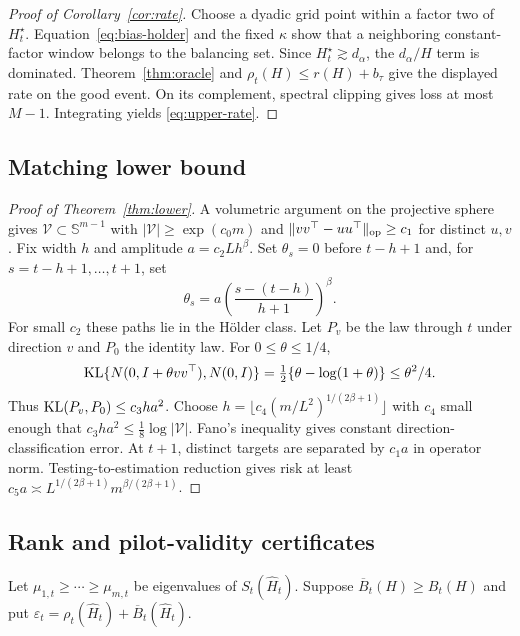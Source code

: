 \begin{proof}[Proof of Corollary~\ref{cor:rate}]
Choose a dyadic grid point within a factor two of $H_t^\star$.  Equation~\eqref{eq:bias-holder} and the fixed $\kappa$ show that a neighboring constant-factor window belongs to the balancing set.  Since $H_t^\star\gtrsim d_\alpha$, the $d_\alpha/H$ term is dominated.  Theorem~\ref{thm:oracle} and $\rho_t(H)\le r(H)+b_\tau$ give the displayed rate on the good event.  On its complement, spectral clipping gives loss at most $M-1$.  Integrating yields \eqref{eq:upper-rate}.  \end{proof}

\subsection{Matching lower bound}

\begin{proof}[Proof of Theorem~\ref{thm:lower}]
A volumetric argument on the projective sphere gives $\mathcal V\subset\mathbb S^{m-1}$ with $|\mathcal V|\ge\exp(c_0m)$ and $\|vv^\top-uu^\top\|_{\mathrm{op}}\ge c_1$ for distinct $u,v$.  Fix width $h$ and amplitude $a=c_2Lh^\beta$.  Set $\theta_s=0$ before $t-h+1$ and, for $s=t-h+1,\ldots,t+1$, set
\begin{equation}
 \theta_s=a\left(\frac{s-(t-h)}{h+1}\right)^\beta.
\end{equation}
For small $c_2$ these paths lie in the H\"older class.  Let $P_v$ be the law through $t$ under direction $v$ and $P_0$ the identity law.  For $0\le\theta\le1/4$,
\begin{equation}
 \operatorname{KL}\{N(0,I+\theta vv^\top),N(0,I)\}
 =\tfrac12\{\theta-\log(1+\theta)\}\le\theta^2/4.
\end{equation}
Thus $\operatorname{KL}(P_v,P_0)\le c_3ha^2$.  Choose
$h=\lfloor c_4(m/L^2)^{1/(2\beta+1)}\rfloor$ with $c_4$ small enough that $c_3ha^2\le\frac18\log|\mathcal V|$.  Fano's inequality gives constant direction-classification error.  At $t+1$, distinct targets are separated by $c_1a$ in operator norm.  Testing-to-estimation reduction gives risk at least $c_5a\asymp L^{1/(2\beta+1)}m^{\beta/(2\beta+1)}$.  \end{proof}

\subsection{Rank and pilot-validity certificates}

Let $\mu_{1,t}\ge\cdots\ge\mu_{m,t}$ be eigenvalues of $S_t(\widehat H_t)$.  Suppose $\overline B_t(H)\ge B_t(H)$ and put
$\varepsilon_t=\rho_t(\widehat H_t)+\overline B_t(\widehat H_t)$.

